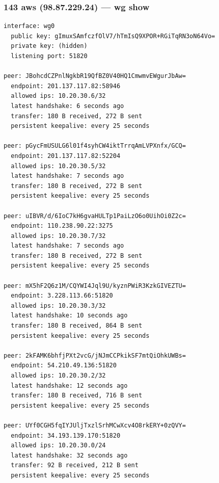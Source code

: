 \documentclass[11pt,a4paper]{article}
\begin{document}
\subsubsection*{143 aws (98.87.229.24) — wg show}
\begin{lstlisting}
interface: wg0
  public key: gImuxSAmfczfOlV7/hTmIsQ9XPOR+RGiTqRN3oN64Vo=
  private key: (hidden)
  listening port: 51820

peer: JBohcdCZPnlNgkbR19QfBZ0V40HQ1CmwmvEWgurJbAw=
  endpoint: 201.137.117.82:58946
  allowed ips: 10.20.30.6/32
  latest handshake: 6 seconds ago
  transfer: 180 B received, 272 B sent
  persistent keepalive: every 25 seconds

peer: pGycFmUSULG6l01f4syhCW4iktTrrqAmLVPXnfx/GCQ=
  endpoint: 201.137.117.82:52204
  allowed ips: 10.20.30.5/32
  latest handshake: 7 seconds ago
  transfer: 180 B received, 272 B sent
  persistent keepalive: every 25 seconds

peer: uIBVR/d/6IoC7kH6gvaHULTp1PaiLzO6o0UihOi0Z2c=
  endpoint: 110.238.90.22:3275
  allowed ips: 10.20.30.7/32
  latest handshake: 7 seconds ago
  transfer: 180 B received, 272 B sent
  persistent keepalive: every 25 seconds

peer: mX5hF2Q6z1M/CQYWI4Jql9U/kyznPWiR3KzkGIVEZTU=
  endpoint: 3.228.113.66:51820
  allowed ips: 10.20.30.3/32
  latest handshake: 10 seconds ago
  transfer: 180 B received, 864 B sent
  persistent keepalive: every 25 seconds

peer: 2kFAMK6bhfjPXt2vcG/jNJmCCPkikSF7mtQiOhkUWBs=
  endpoint: 54.210.49.136:51820
  allowed ips: 10.20.30.2/32
  latest handshake: 12 seconds ago
  transfer: 180 B received, 716 B sent
  persistent keepalive: every 25 seconds

peer: UYf0CGH5fqIYJUljTxzlSrhMCwXcv4O8rkERY+0zQVY=
  endpoint: 34.193.139.170:51820
  allowed ips: 10.20.30.0/24
  latest handshake: 32 seconds ago
  transfer: 92 B received, 212 B sent
  persistent keepalive: every 25 seconds

\end{lstlisting}
\end{document}

